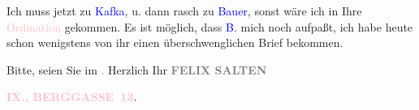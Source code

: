 \pstart
           Ich muss jetzt zu \textcolor{blue}{Kafka}{}\ledrightnote{\textcolor{blue}{Eduard Michael Kafka}}, u. dann rasch zu \textcolor{blue}{Bauer}{}\ledrightnote{\textcolor{blue}{Julius Bauer}}, sonst wäre ich in Ihre \textcolor{pink}{Ordination}{}\ledrightnote{{$\rightarrow$}\textcolor{pink}{Ordination Dr. Arthur Schnitzler}} gekommen. Es ist möglich, dass
                  \textcolor{blue}{B.}{}\ledrightnote{\textcolor{blue}{Bertha Karlsburg}} mich noch aufpaßt, ich habe heute schon
               wenigstens von ihr einen überschweng{\pb}lichen Brief bekommen.\pend
           
\pstart
           Bitte, seien Sie im \label{K_L03107-3v}\label{K_L03107-3h}\textcolor{gray}{.}\pend
           \pstart Herzlich Ihr\pend{}
\pstart
           \centering{}\textcolor{gray}{\textbf{FELIX SALTEN}}\pend
           
\pstart
           \noindent{}\raggedleft{}\textcolor{gray}{\textbf{\textcolor{pink}{IX., BERGGASSE 13}{}\ledrightnote{\textcolor{pink}{Berggasse}}.}}\pend
           \endnumbering{}  
      